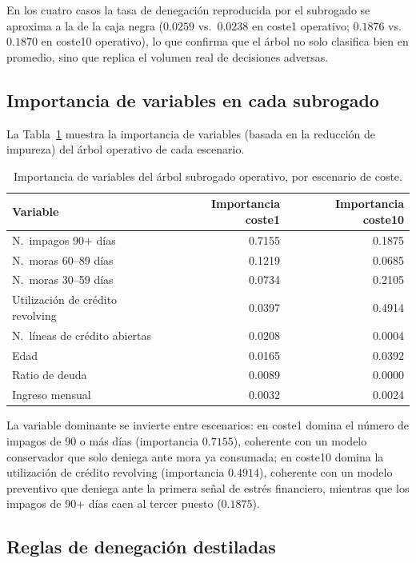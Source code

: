 \documentclass[11pt,a4paper]{article}
\begin{document}
En los cuatro casos la tasa de denegación reproducida por el subrogado se aproxima a la de la caja negra ($0.0259$ vs.\ $0.0238$ en coste1 operativo; $0.1876$ vs.\ $0.1870$ en coste10 operativo), lo que confirma que el árbol no solo clasifica bien en promedio, sino que replica el volumen real de decisiones adversas.

\subsection{Importancia de variables en cada subrogado}
\label{sec:sub-importancia}

La Tabla~\ref{tab:sub-importancia} muestra la importancia de variables (basada en la reducción de impureza) del árbol operativo de cada escenario.

\begin{table}[H]
\centering
\caption{Importancia de variables del árbol subrogado operativo, por escenario de coste.}
\label{tab:sub-importancia}
\begin{tabular}{lrr}
\toprule
Variable & Importancia coste1 & Importancia coste10 \\
\midrule
N.\ impagos 90+ días & 0.7155 & 0.1875 \\
N.\ moras 60--89 días & 0.1219 & 0.0685 \\
N.\ moras 30--59 días & 0.0734 & 0.2105 \\
Utilización de crédito revolving & 0.0397 & 0.4914 \\
N.\ líneas de crédito abiertas & 0.0208 & 0.0004 \\
Edad & 0.0165 & 0.0392 \\
Ratio de deuda & 0.0089 & 0.0000 \\
Ingreso mensual & 0.0032 & 0.0024 \\
\bottomrule
\end{tabular}
\end{table}

La variable dominante se invierte entre escenarios: en coste1 domina el número de impagos de 90 o más días (importancia $0.7155$), coherente con un modelo conservador que solo deniega ante mora ya consumada; en coste10 domina la utilización de crédito revolving (importancia $0.4914$), coherente con un modelo preventivo que deniega ante la primera señal de estrés financiero, mientras que los impagos de 90+ días caen al tercer puesto ($0.1875$).

\subsection{Reglas de denegación destiladas}
\label{sec:sub-reglas}
\end{document}
